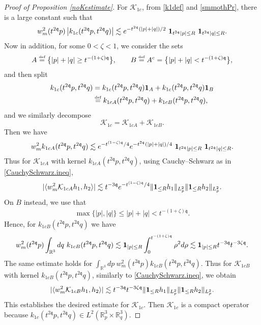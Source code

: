 \documentclass[reqno]{amsart}
\newcommand{\eqdef }{\overset{\mbox{\tiny{def}}}{=}}
\newcommand{\pv}{p}
\newcommand{\pZ}{|\pv|}
\newcommand{\qv}{q}
\newcommand{\qZ}{|\qv|}
\newcommand{\threed}{{\mathbb R}^3}
\newcommand{\qq}{\mathfrak{q}}
\newcommand{\tqq}{t^{2\qq}}
\newcommand{\tmTq}{t^{-3\qq}}
\newcommand{\compK}{\mathcal{K}}
\newcommand{\ind}{{\bf 1}}
\newcommand{\spr}{\zeta}
\theoremstyle{definition}
\numberwithin{equation}{section}
\numberwithin{theorem}{section}
\begin{document}
\begin{proof}[Proof of Proposition \ref{noKestimate}]
For $\compK_{1c}$, from \eqref{k1def} and \eqref{smmothPr}, there is a large constant such that 
\begin{align*}
    w_{m}^2(\tqq \pv) \left| k_{1c}(\tqq p,\tqq q) \right| 
\lesssim e^{-\tqq (\pZ+\qZ)/2} ~ \ind_{\tqq|p|\le R} ~ \ind_{\tqq|q|\le R}.
\end{align*}
Now in addition, for some $0< \spr < 1$, we consider the sets 
\begin{align}\label{time.split.cmpt}
  A \eqdef \big\{   |p|+ |q| \geq t^{-(1+\spr)\qq}\big\}, \qquad B \eqdef A^c = \big\{   |p|+ |q| < t^{-(1+\spr)\qq}\big\},
\end{align}
and then split
\begin{align*}
    k_{1c}(\tqq p,\tqq q)&=k_{1c}(\tqq p,\tqq q) \ind_{A}+k_{1c}(\tqq p,\tqq q) \ind_{B}\\
    &\eqdef k_{1cA}(\tqq p,\tqq q)+k_{1cB}(\tqq p,\tqq q),
\end{align*}
and we similarly decompose \[\mathcal{K}_{1c}=\mathcal{K}_{1cA}+\mathcal{K}_{1cB}.\]
Then we have 
\begin{align*}
   w_{m}^2  k_{1cA}(\tqq p,\tqq q)  
\lesssim e^{-t^{(1-\spr)\qq} /4}e^{-\tqq (\pZ+\qZ)/4} ~ \ind_{\tqq|p|\le R} ~ \ind_{\tqq|q|\le R}.
\end{align*}
Thus for $\compK_{1cA}$ with kernel $k_{1cA}(\tqq p,\tqq q)$, using Cauchy--Schwarz as in \eqref{CauchySchwarz.ineq},
\begin{align*}
    |\langle  w_{m}^2 \compK_{1cA} h_1, h_2\rangle |
\lesssim
\tmTq e^{-t^{(1-\spr)\qq}/4}\|\ind_{\le R} h_1 \|_{L^2_p} \| \ind_{\le R} h_2 \|_{L^2_p}.
\end{align*}
On $B$ instead, we use that 
\begin{align*}
\max \{ |p|, |q|\} \leq  |p|+ |q| < t^{-(1+\spr)\qq}.
\end{align*}
Hence, for $k_{1cB}(\tqq p,\tqq q)$ we have 
\begin{align*}
w_{m}^2(\tqq \pv)\int_{\mathbb{R}^3}dq ~
 k_{1cB}(\tqq p,\tqq q)
\lesssim \ind_{|p|\le R} \int_0^{t^{-(1+\spr)\qq}} \rho^2 d\rho \lesssim \ind_{|p|\le R} t^{-3\qq} t^{-3\spr\qq}.
\end{align*}
The same estimate holds for $\int_{\mathbb{R}^3}dp ~ w_{m}^2(\tqq \pv)
k_{1cB}(\tqq p,\tqq q)$.  Thus for $\compK_{1cB}$ with kernel $k_{1cB}(\tqq p,\tqq q)$,  similarly to \eqref{CauchySchwarz.ineq}, we obtain
\begin{align*}
    |\langle w_{m}^2 \compK_{1cB} h_1, h_2\rangle |
\lesssim
\tmTq  t^{-3\spr\qq}\|\ind_{\le R} h_1 \|_{L^2_p} \| \ind_{\le R} h_2 \|_{L^2_p}.
\end{align*}
This establishes the desired estimate for $\compK_{1c}$. Then $\compK_{1c}$ is a compact operator because $k_{1c}(\tqq p,\tqq q) \in L^2(\threed_p\times \threed_q)$.



\end{proof}
\end{document}
